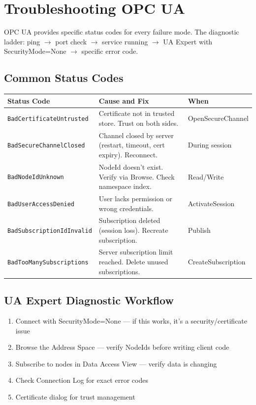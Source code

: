 \documentclass[12pt,twoside,openright]{memoir}
\begin{document}
\chapter{Troubleshooting OPC UA}

OPC UA provides specific status codes for every failure mode. The diagnostic ladder: ping $\to$ port check
$\to$ service running $\to$ UA Expert with SecurityMode=None $\to$ specific error code.

\section{Common Status Codes}

\begin{tabularx}{\textwidth}{lXl}
\toprule
\textbf{Status Code} & \textbf{Cause and Fix} & \textbf{When} \\
\midrule
\rowcolor{rowlight} \texttt{BadCertificateUntrusted} & Certificate not in trusted store. Trust on both sides. & OpenSecureChannel \\
\texttt{BadSecureChannelClosed} & Channel closed by server (restart, timeout, cert expiry). Reconnect. & During session \\
\rowcolor{rowlight} \texttt{BadNodeIdUnknown} & NodeId doesn't exist. Verify via Browse. Check namespace index. & Read/Write \\
\texttt{BadUserAccessDenied} & User lacks permission or wrong credentials. & ActivateSession \\
\rowcolor{rowlight} \texttt{BadSubscriptionIdInvalid} & Subscription deleted (session loss). Recreate subscription. & Publish \\
\texttt{BadTooManySubscriptions} & Server subscription limit reached. Delete unused subscriptions. & CreateSubscription \\
\bottomrule
\end{tabularx}

\section{UA Expert Diagnostic Workflow}

\begin{enumerate}
  \item Connect with SecurityMode=None --- if this works, it's a security/certificate issue
  \item Browse the Address Space --- verify NodeIds before writing client code
  \item Subscribe to nodes in Data Access View --- verify data is changing
  \item Check Connection Log for exact error codes
  \item Certificate dialog for trust management
\end{enumerate}
\end{document}
